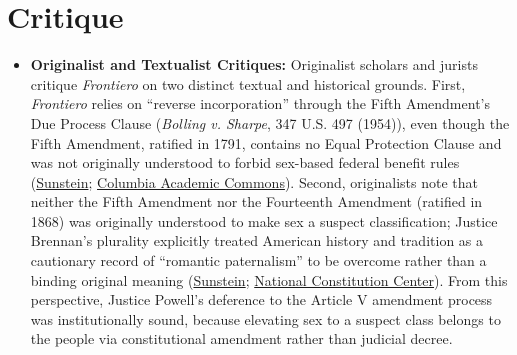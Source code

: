\documentclass[12pt]{article}
\begin{document}
\section{Critique}
\begin{itemize}
    \item \textbf{Originalist and Textualist Critiques:} Originalist scholars and jurists critique \textit{Frontiero} on two distinct textual and historical grounds. First, \textit{Frontiero} relies on ``reverse incorporation'' through the Fifth Amendment's Due Process Clause (\textit{Bolling v. Sharpe}, 347 U.S. 497 (1954)), even though the Fifth Amendment, ratified in 1791, contains no Equal Protection Clause and was not originally understood to forbid sex-based federal benefit rules (\href{https://casssunstein.substack.com/p/the-sex-discrimination-cases-of-the}{Sunstein}; \href{https://academiccommons.columbia.edu/doi/10.7916/3jrg-8056/download}{Columbia Academic Commons}). Second, originalists note that neither the Fifth Amendment nor the Fourteenth Amendment (ratified in 1868) was originally understood to make sex a suspect classification; Justice Brennan's plurality explicitly treated American history and tradition as a cautionary record of ``romantic paternalism'' to be overcome rather than a binding original meaning (\href{https://casssunstein.substack.com/p/the-sex-discrimination-cases-of-the}{Sunstein}; \href{https://constitutioncenter.org/the-constitution/white-papers/democratic-constitutionalism}{National Constitution Center}). From this perspective, Justice Powell's deference to the Article V amendment process was institutionally sound, because elevating sex to a suspect class belongs to the people via constitutional amendment rather than judicial decree.

\end{itemize}
\end{document}
